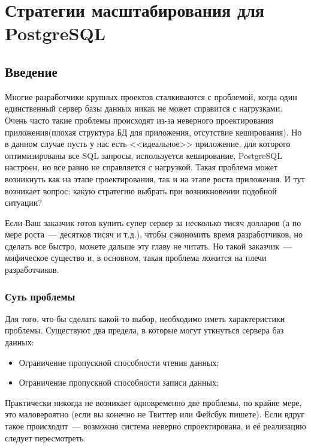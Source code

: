\chapter{Стратегии масштабирования для PostgreSQL}
\begin{epigraphs}
\end{epigraphs}

\section{Введение}
Многие разработчики крупных проектов сталкиваются с проблемой, когда один единственный сервер 
базы данных никак не может справится с нагрузками. Очень часто такие проблемы происходят из-за 
неверного проектирования приложения(плохая структура БД для приложения, отсутствие кеширования). Но в данном 
случае пусть у нас есть <<идеальное>> приложение, для которого оптимизированы все SQL запросы, используется кеширование, 
PostgreSQL настроен, но все равно не справляется с нагрузкой. Такая проблема может возникнуть как на этапе проектирования, 
так и на этапе роста приложения. И тут возникает вопрос: какую стратегию выбрать при возникновении подобной ситуации?

Если Ваш заказчик готов купить супер сервер за несколько тисяч долларов 
(а по мере роста~--- десятков тисяч и т.д.), чтобы сэкономить время разработчиков, но сделать все быстро, 
можете дальше эту главу не читать. Но такой заказчик~--- мифическое существо и, в основном, такая проблема 
ложится на плечи разработчиков.

\subsection{Суть проблемы}

Для того, что-бы сделать какой-то выбор, необходимо иметь характеристики проблемы. 
Существуют два предела, в которые могут уткнуться сервера баз данных:

\begin{itemize}
\item Ограничение пропускной способности чтения данных;
\item Ограничение пропускной способности записи данных;
\end{itemize}

Практически никогда не возникает одновременно две проблемы, по крайне мере, это маловероятно (если вы конечно не Твиттер 
или Фейсбук пишете). Если вдруг такое происходит~--- возможно система неверно спроектирована, и её реализацию следует пересмотреть.